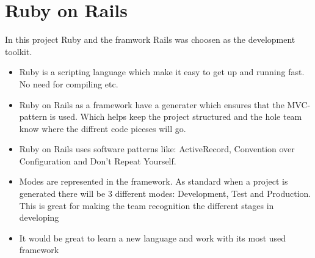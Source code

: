 \section{Ruby on Rails}

In this project Ruby and the framwork Rails was choosen as the development toolkit.


\begin{itemize}
	\item Ruby is a scripting language which make it easy to get up and running fast. No need for compiling etc.
	\item Ruby on Rails as a framework have a generater which ensures that the MVC-pattern is used. Which helps keep the project structured and the hole team know where the diffrent code piceses will go.
	
	\item Ruby on Rails uses software patterns like: ActiveRecord, Convention over Configuration and Don't Repeat Yourself.
	\item Modes are represented in the framework. As standard when a project is generated there will be 3 different modes: Development, Test and Production. This is great for making the team recognition the different stages in developing
	
	\item It would be great to learn a new language and work with its most used framework
\end{itemize}


